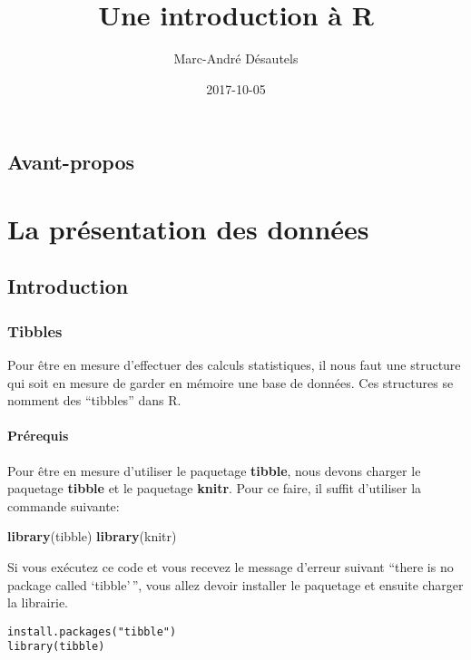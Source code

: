 \documentclass[]{book}
\title{Une introduction à R}
\author{Marc-André Désautels}
\date{2017-10-05}
\newenvironment{Shaded}{\begin{snugshade}}{\end{snugshade}}
\newcommand{\KeywordTok}[1]{\textcolor[rgb]{0.13,0.29,0.53}{\textbf{#1}}}
\newcommand{\NormalTok}[1]{#1}
\begin{document}
\maketitle

{
\setcounter{tocdepth}{1}
\tableofcontents
}
\chapter*{Avant-propos}\label{avant-propos}

\part{La présentation des
données}\label{part-la-presentation-des-donnees}

\chapter{Introduction}\label{intro}

\section{Tibbles}\label{tibbles}

Pour être en mesure d'effectuer des calculs statistiques, il nous faut
une structure qui soit en mesure de garder en mémoire une base de
données. Ces structures se nomment des ``tibbles'' dans R.

\subsection{Prérequis}\label{prerequis}

Pour être en mesure d'utiliser le paquetage \textbf{tibble}, nous devons
charger le paquetage \textbf{tibble} et le paquetage \textbf{knitr}.
Pour ce faire, il suffit d'utiliser la commande suivante:

\begin{Shaded}
\begin{Highlighting}[]
\KeywordTok{library}\NormalTok{(tibble)}
\KeywordTok{library}\NormalTok{(knitr)}
\end{Highlighting}
\end{Shaded}

Si vous exécutez ce code et vous recevez le message d'erreur suivant
``there is no package called `tibble'\,'', vous allez devoir installer
le paquetage et ensuite charger la librairie.

\begin{verbatim}
install.packages("tibble")
library(tibble)
\end{verbatim}
\end{document}
